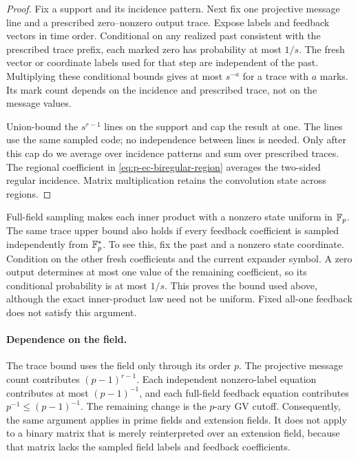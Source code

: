 \begin{proof}
Fix a support and its incidence pattern.  Next fix one projective message
line and a prescribed zero--nonzero output trace.  Expose labels and feedback
vectors in time order.  Conditional on any realized past consistent with
the prescribed trace prefix, each marked zero has probability at most $1/s$.
The fresh vector or coordinate labels used for that step are independent of
the past.  Multiplying these conditional bounds gives at most $s^{-a}$ for
a trace with $a$ marks.  Its mark count depends on the incidence and prescribed
trace, not on the message values.

Union-bound the $s^{r-1}$ lines on the support and cap the result at one.
The lines use the same sampled code; no independence between lines is needed.
Only after this cap do we average over incidence patterns and sum over
prescribed traces.  The regional
coefficient in \eqref{eq:p-ec-biregular-region} averages the two-sided regular
incidence.  Matrix multiplication retains the convolution state across
regions.
\end{proof}

Full-field sampling makes each inner product with a nonzero state uniform in
$\mathbb F_p$.  The same trace upper bound also holds if every feedback coefficient
is sampled independently from $\mathbb F_p^*$.  To see this, fix the past and a
nonzero state coordinate.  Condition on the other fresh coefficients and the
current expander symbol.  A zero output determines at most one value of the
remaining coefficient, so its conditional probability is at most $1/s$.
This proves the bound used above, although the exact inner-product law need
not be uniform.  Fixed all-one feedback does not satisfy this argument.

\paragraph{Dependence on the field.}
The trace bound uses the field only through its order $p$.  The projective
message count contributes $(p-1)^{r-1}$.  Each independent nonzero-label
equation contributes at most $(p-1)^{-1}$, and each full-field feedback
equation contributes $p^{-1}\leq(p-1)^{-1}$.  The remaining change is the
$p$-ary GV cutoff.  Consequently, the same argument applies in prime fields
and extension fields.  It does not apply to a binary matrix that is merely
reinterpreted over an extension field, because that matrix lacks the sampled
field labels and feedback coefficients.

